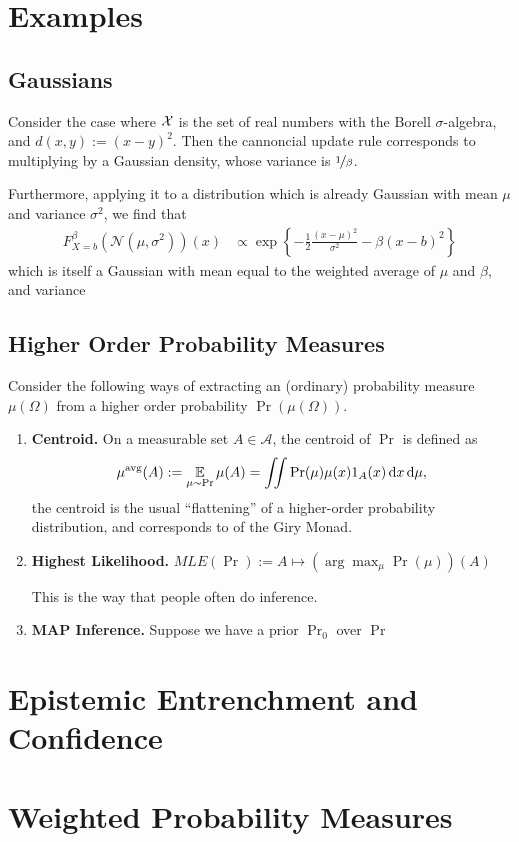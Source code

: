 \documentclass{article}
\begin{document}
\section{Examples}
\subsection{Gaussians}
Consider the case where $\mathcal X$ is the set of real numbers with the Borell $\sigma$-algebra, and $d(x,y) := (x-y)^2$.
Then the cannoncial update rule corresponds to multiplying by a Gaussian density, whose variance is $\nicefrac1\beta$.

Furthermore, applying it to a distribution which is already Gaussian with mean $\mu$ and variance $\sigma^2$, we find that
\begin{align*}
    F^{\beta}_{X=b}(\mathcal N(\mu, \sigma^2))(x) &\propto
     \exp\left\{ - \frac12 \frac{(x-\mu)^2}{ \sigma^2 } - \beta(x-b)^2\right\}
\end{align*}
which is itself a Gaussian with mean equal to the weighted average of $\mu$ and $\beta$, and variance


\subsection{Higher Order Probability Measures}
Consider the following ways of extracting an (ordinary) probability measure $\mu(\Omega)$
from a higher order probability $\Pr(\mu(\Omega))$.

\begin{enumerate}
    \item \textbf{Centroid.}
        On a measurable set $A \in \mathcal A$, the centroid of $\Pr$ is defined as
        \[
            \mu^{\text{avg}}(A) := \operatorname*{\mathbb{E}}_{\mu \sim \Pr} \mu(A) =
                \iint \Pr(\mu) \mu(x) 1_{A}(x)\, \mathrm d x\,\mathrm d\mu,
        \]
        the centroid is the usual ``flattening'' of a higher-order probability distribution, and corresponds to
        of the Giry Monad.

    \item \textbf{Highest Likelihood.}
        $\textit{MLE}(\Pr) := A \mapsto (\arg\max_\mu \Pr(\mu))(A)$

        This is the way that people often do inference.

    \item \textbf{MAP Inference.}
        Suppose we have a prior $\Pr_0$ over  $\Pr$

\end{enumerate}


\section{Epistemic Entrenchment and Confidence}
\section{Weighted Probability Measures}
\end{document}
